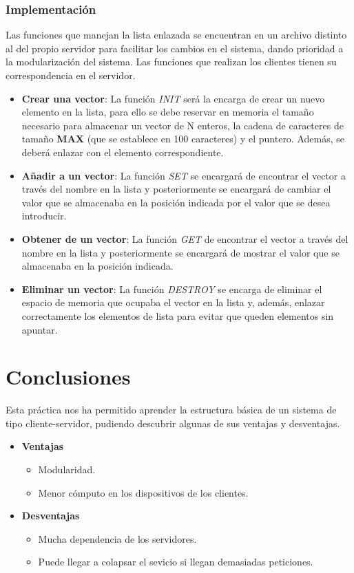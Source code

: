 \documentclass[10pt, spanish, pdftex]{template/UC3M_document}
\begin{document}
\subsubsection{Implementación}
Las funciones que manejan la lista enlazada se encuentran en un archivo distinto al del propio servidor para facilitar los cambios en el sistema, dando prioridad a la modularización del sistema. Las funciones que realizan los clientes tienen su correspondencia en el servidor.
\begin{itemize}
    \item \textbf{Crear una vector}: La función \textit{INIT} será la encarga de crear un nuevo elemento en la lista, para ello se debe reservar en memoria el tamaño necesario para almacenar un vector de N enteros, la cadena de caracteres de tamaño \textbf{MAX} (que se establece en 100 caracteres) y el puntero. Además, se deberá enlazar con el elemento correspondiente.
    \item \textbf{Añadir a un vector}: La función \textit{SET} se encargará de encontrar el vector a través del nombre en la lista y posteriormente se encargará de cambiar el valor que se almacenaba en la posición indicada por el valor que se desea introducir.
    \item \textbf{Obtener de un vector}: La función \textit{GET} de encontrar el vector a través del nombre en la lista y posteriormente se encargará de mostrar el valor que se almacenaba en la posición indicada.
    \item \textbf{Eliminar un vector}: La función \textit{DESTROY} se encarga de eliminar el espacio de memoria que ocupaba el vector en la lista y, además, enlazar correctamente los elementos de lista para evitar que queden elementos sin apuntar.
\end{itemize}






\newpage
\section{Conclusiones}
Esta práctica nos ha permitido aprender la estructura básica de un sistema de tipo cliente-servidor, pudiendo descubrir algunas de sus ventajas y desventajas.

\begin{itemize}
  \item \textbf{Ventajas}
    \begin{itemize}
      \item Modularidad.
      \item Menor cómputo en los dispositivos de los clientes.
    \end{itemize}
  \item \textbf{Desventajas}
  \begin{itemize}
    \item Mucha dependencia de los servidores.
    \item Puede llegar a colapsar el sevicio si llegan demasiadas peticiones.
  \end{itemize}
\end{itemize}
\end{document}
